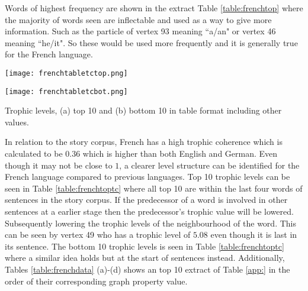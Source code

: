 Words of highest frequency are shown in the extract Table \ref{table:frenchtop} where the majority of words seen are inflectable and used as a way to give more information. Such as the particle of vertex 93 meaning ``a/an" or vertex 46 meaning ``he/it". So these would be used more frequently and it is generally true for the French language.

\begin{table}[!htb]
\centering
\begin{subtable}{.45\textwidth}
	\centering
	\texttt{[image: frenchtabletctop.png]}
	\caption{}
	\label{table:frenchtoptc}
\end{subtable}
\hfill
\begin{subtable}{.45\textwidth}
	\centering
	\texttt{[image: frenchtabletcbot.png]}
	\caption{}
	\label{table:frenchbottc}
\end{subtable}
\caption{Trophic levels, (a) top 10 and (b) bottom 10 in table format including other values.}
\end{table}

In relation to the story corpus, French has a high trophic coherence which is calculated to be $0.36$ which is higher than both English and German. Even though it may not be close to $1$, a clearer level structure can be identified for the French language compared to previous languages. Top 10 trophic levels can be seen in Table \ref{table:frenchtoptc} where all top 10 are within the last four words of sentences in the story corpus. If the predecessor of a word is involved in other sentences at a earlier stage then the predecessor's trophic value will be lowered. Subsequently lowering the trophic levels of the neighbourhood of the word. This can be seen by vertex 49 who has a trophic level of $5.08$ even though it is last in its sentence. The bottom 10 trophic levels is seen in Table \ref{table:frenchtoptc} where a similar idea holds but at the start of sentences instead. Additionally, Tables \ref{table:frenchdata} (a)-(d) shows an top 10 extract of Table \ref{app:} in the order of their corresponding graph property value.

